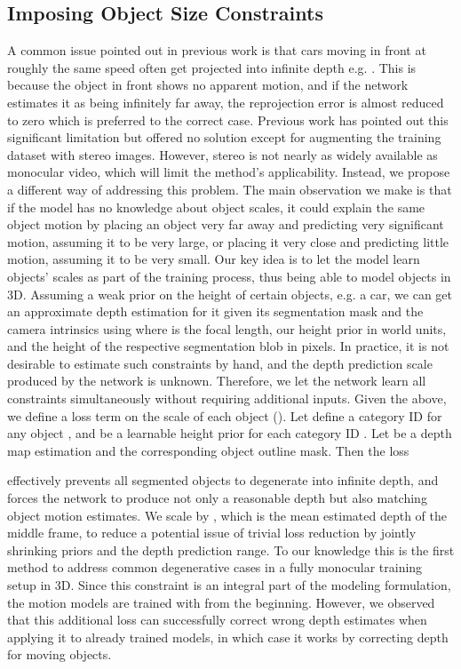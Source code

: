 \documentclass[letterpaper]{article} \usepackage{aaai19}  \usepackage{times}  \usepackage{helvet}  \usepackage{courier}  \usepackage{url}  \usepackage{graphicx}  \frenchspacing
\begin{document}
\subsection{Imposing Object Size Constraints}
A common issue pointed out in previous work is that cars moving in front at roughly the same speed often get projected into infinite depth e.g. \cite{godard2018digging,yang2018every}. This is because the object in front shows no apparent motion, and if the network estimates it as being infinitely far away, the reprojection error is almost reduced to zero which is preferred to the correct case.
Previous work has pointed out this significant limitation \cite{godard2018digging} \cite{yang2018every} \cite{wang2018learning} but offered no solution except for augmenting the training dataset with stereo images. However, stereo is not nearly as widely available as monocular video, which will limit the method's applicability.
Instead, we propose a different way of addressing this problem. The main observation we make is that if the model has no knowledge about object scales, it could explain the same object motion by placing an object very far away and predicting very significant motion, assuming it to be very large, or placing it very close and predicting little motion, assuming it to be very small. Our key idea is to let the model learn objects' scales as part of the training process, thus being able to model objects in 3D.
Assuming a weak prior on the height of certain objects, e.g. a car, we can get an approximate depth estimation for it given its segmentation mask and the camera intrinsics using  where  is the focal length,  our height prior in world units, and  the height of the respective segmentation blob in pixels. In practice, it is not desirable to estimate such constraints by hand, and the depth prediction scale produced by the network is unknown. Therefore, we let the network learn all constraints simultaneously without requiring additional inputs.
Given the above, we define a loss term on the scale of each object  (). Let  define a category ID for any object , and  be a learnable height prior for each category ID . Let  be a depth map estimation and  the corresponding object outline mask. Then the loss

effectively prevents all segmented objects to degenerate into infinite depth, and forces the network to produce not only a reasonable depth but also matching object motion estimates.
We scale by , which is the mean estimated depth of the middle frame, to reduce a potential issue of trivial loss reduction by jointly shrinking priors and the depth prediction range.
To our knowledge this is the first method to address common degenerative cases in a fully monocular training setup in 3D.
Since this constraint is an integral part of the modeling formulation, the motion models are trained with  from the beginning. However, we observed that this additional loss can successfully correct wrong depth estimates when applying it to already trained models, in which case it works by correcting depth for moving objects.
\end{document}
